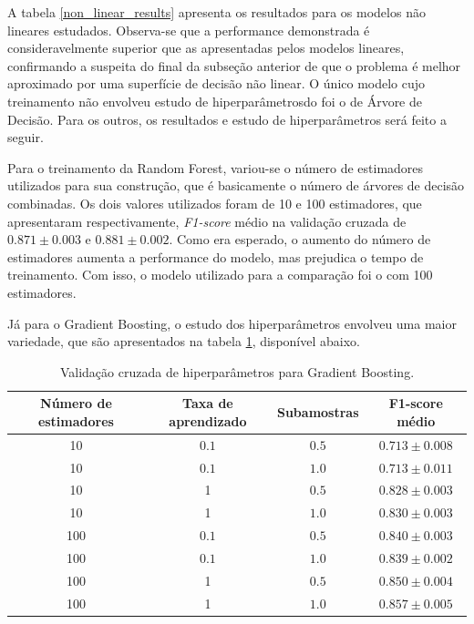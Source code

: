 \documentclass{homework}
\begin{document}
A tabela \ref{non_linear_results} apresenta os resultados para os modelos não lineares estudados. Observa-se que a
performance demonstrada é consideravelmente superior que as apresentadas pelos modelos lineares, confirmando a
suspeita do final da subseção anterior de que o problema é melhor aproximado por uma superfície de decisão não linear.
O único modelo cujo treinamento não envolveu estudo de hiperparâmetrosdo foi o de Árvore de Decisão. Para os outros, os
resultados e estudo de hiperparâmetros será feito a seguir.

Para o treinamento da Random Forest, variou-se o número de estimadores utilizados para sua construção, que é basicamente
o número de árvores de decisão combinadas. Os dois valores utilizados foram de 10 e 100 estimadores, que apresentaram
respectivamente, \textit{F1-score} médio na validação cruzada de $0.871 \pm 0.003$ e $0.881 \pm 0.002$. Como era
esperado, o aumento do número de estimadores aumenta a performance do modelo, mas prejudica o tempo de treinamento. Com
isso, o modelo utilizado para a comparação foi o com 100 estimadores.

Já para o Gradient Boosting, o estudo dos hiperparâmetros envolveu uma maior variedade, que são apresentados na tabela
\ref{gb_hiperparams}, disponível abaixo.

\begin{table}[h!]
    \centering
    \begin{tabular}{|c|c|c|c|}
        \hline
        \textbf{Número de estimadores} & \textbf{Taxa de aprendizado} & \textbf{Subamostras} & \textbf{F1-score médio} \\
        \hline
        10 & $0.1$ & $0.5$ & $0.713 \pm 0.008$ \\
        \hline
        10 & $0.1$ & $1.0$ & $0.713 \pm 0.011$ \\
        \hline
        10 & 1 & $0.5$ & $0.828 \pm 0.003$ \\
        \hline
        10 & 1 & $1.0$ & $0.830 \pm 0.003$ \\
        \hline
        100 & $0.1$ & $0.5$ & $0.840 \pm 0.003$ \\
        \hline
        100 & $0.1$ & $1.0$ & $0.839 \pm 0.002$ \\
        \hline
        100 & 1 & $0.5$ & $0.850 \pm 0.004$ \\
        \hline
        100 & 1 & $1.0$ & $0.857 \pm 0.005$ \\
        \hline
    \end{tabular}
    \caption{Validação cruzada de hiperparâmetros para Gradient Boosting.}
    \label{gb_hiperparams}
\end{table}
\end{document}
